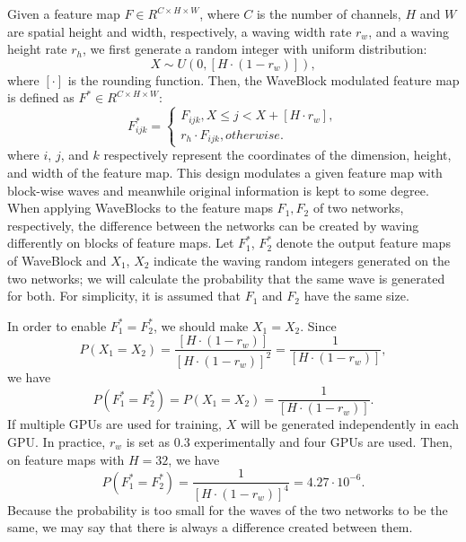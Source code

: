 \documentclass[journal]{IEEEtran}
\begin{document}
Given a feature map $F \in {R^{C \times H \times W}}$, where $C$ is the number of channels, $H$ and $W$ are spatial height and width, respectively, a waving width rate $r_w$, and a waving height rate $r_h$, we first generate a random integer with uniform distribution: 
\begin{equation}
X \sim U(0,[H\cdot(1-r_w)]),
\end{equation}
where $[ \cdot ]$ is the rounding function. Then, the WaveBlock modulated feature map is defined as ${F^ *} \in {R^{ C \times H \times W}}$:
\begin{equation}
F_{ijk}^* = \left\{ {\begin{array}{*{20}{l}}
{{F_{ijk}},X \le j < X + \left[ {H \cdot r_w} \right],}\\
{r_h \cdot {F_{ijk}},otherwise.}
\end{array}} \right.
\end{equation}
where $i$, $j$, and $k$ respectively represent the coordinates of the dimension, height, and width of the feature map. This design modulates a given feature map with block-wise waves and meanwhile original information is kept to some degree. When applying WaveBlocks to the feature maps $F_1,F_2$ of two networks, respectively, the difference between the networks can be created by waving differently on blocks of feature maps. Let $F_1^*$, $F_2^*$ denote the output feature maps of WaveBlock and $X_1$, $X_2$ indicate the waving random integers generated on the two networks; we will calculate the probability that the same wave is generated for both. For simplicity, it is assumed that $F_1$ and $F_2$ have the same size.\par 
In order to enable $F_1^ *  = F_2^ * $, we should make $X_1 = X_2$. 
Since
\begin{equation}
P\left( {X_1 = X_2} \right) = \frac{{\left[ {H \cdot \left( {1 - r_w} \right)} \right]}}{{{{\left[ {H \cdot \left( {1 - r_w} \right)} \right]}^2}}} = \frac{1}{{\left[ {H \cdot \left( {1 - r_w} \right)} \right]}},
\end{equation}
we have
\begin{equation}
P\left( F_1^ *  = F_2^ * \right) = P\left( {{X_1} = {X_2}} \right) = \frac{1}{{\left[ {H \cdot \left( {1 - r_w} \right)} \right]}}.
\end{equation}
If multiple GPUs are used for training, $X$ will be generated independently in each GPU. In practice, $r_w$ is set as $0.3$ experimentally and four GPUs are used. Then, on feature maps with $H=32$, we have
\begin{equation}
P\left( {F_1^* = F_2^*} \right) = \frac{1}{{{{\left[ {H \cdot \left( {1 - r_w} \right)} \right]}^4}}} = 4.27 \cdot {10^{-6}}.
\end{equation}
Because the probability is too small for the waves of the two networks to be the same, we may say that there is always a difference created between them.
\end{document}
